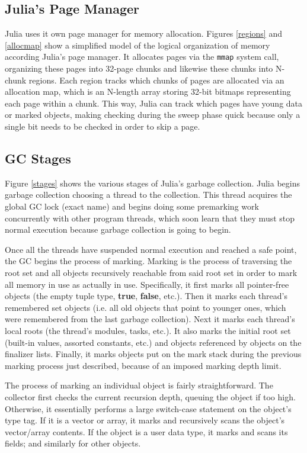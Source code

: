 \subsection{Julia's Page Manager}
Julia uses it own page manager for memory allocation.
Figures \ref{regions} and \ref{allocmap} show a simplified model of the logical organization of memory according Julia's page manager.
It allocates pages via the \texttt{mmap} system call, organizing these pages into 32-page chunks and likewise these chunks into N-chunk regions.
Each region tracks which chunks of pages are allocated via an allocation map, which is an N-length array storing 32-bit bitmaps representing each page within a chunk.
This way, Julia can track which pages have young data or marked objects, making checking during the sweep phase quick because only a single bit needs to be checked in order to skip a page.

\subsection{GC Stages}
Figure \ref{stages} shows the various stages of Julia's garbage collection.
Julia begins garbage collection choosing a thread to the collection.
This thread acquires the global GC lock \todo(exact name) and begins doing some premarking work concurrently with other program threads, which soon learn that they must stop normal execution because garbage collection is going to begin.

Once all the threads have suspended normal execution and reached a safe point, the GC begins the process of marking.
Marking is the process of traversing the root set and all objects recursively reachable from said root set in order to mark all memory in use as actually in use.
Specifically, it first marks all pointer-free objects (the empty tuple type, \textbf{true}, \textbf{false}, etc.).
Then it marks each thread's remembered set objects (i.e. all old objects that point to younger ones, which were remembered from the last garbage collection).
Next it marks each thread's local roots (the thread's modules, tasks, etc.).
It also marks the initial root set (built-in values, assorted constants, etc.) and objects referenced by objects on the finalizer lists.
Finally, it marks objects put on the mark stack during the previous marking process just described, because of an imposed marking depth limit.

The process of marking an individual object is fairly straightforward.
The collector first checks the current recursion depth, queuing the object if too high.
Otherwise, it essentially performs a large switch-case statement on the object's type tag.
If it is a vector or array, it marks and recursively scans the object's vector/array contents.
If the object is a user data type, it marks and scans its fields; and similarly for other objects.


